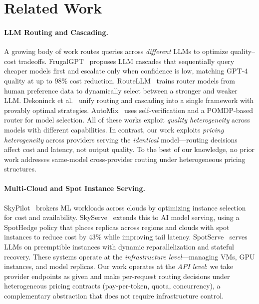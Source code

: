 \section{Related Work}
\label{sec:related}

\paragraph{LLM Routing and Cascading.}
A growing body of work routes queries across \textit{different} LLMs to optimize quality--cost tradeoffs.
FrugalGPT~\cite{chen2023frugalgptuselargelanguage} proposes LLM cascades that sequentially query cheaper models first and escalate only when confidence is low, matching GPT-4 quality at up to 98\% cost reduction.
RouteLLM~\cite{ong2025routellmlearningroutellms} trains router models from human preference data to dynamically select between a stronger and weaker LLM.
Dekoninck et al.~\cite{dekoninck2025unifiedapproachroutingcascading} unify routing and cascading into a single framework with provably optimal strategies.
AutoMix~\cite{aggarwal2025automixautomaticallymixinglanguage} uses self-verification and a POMDP-based router for model selection.
All of these works exploit \textit{quality heterogeneity} across models with different capabilities.
In contrast, our work exploits \textit{pricing heterogeneity} across providers serving the \textit{identical} model---routing decisions affect cost and latency, not output quality.
To the best of our knowledge, no prior work addresses same-model cross-provider routing under heterogeneous pricing structures.

\paragraph{Multi-Cloud and Spot Instance Serving.}
SkyPilot~\cite{DBLP:conf/nsdi/YangWLCBKZLMSS23} brokers ML workloads across clouds by optimizing instance selection for cost and availability.
SkyServe~\cite{DBLP:conf/eurosys/MaoXWCGBYSS25} extends this to AI model serving, using a SpotHedge policy that places replicas across regions and clouds with spot instances to reduce cost by 43\% while improving tail latency.
SpotServe~\cite{miao2023spotserveservinggenerativelarge} serves LLMs on preemptible instances with dynamic reparallelization and stateful recovery.
These systems operate at the \textit{infrastructure level}---managing VMs, GPU instances, and model replicas.
Our work operates at the \textit{API level}: we take provider endpoints as given and make per-request routing decisions under heterogeneous pricing contracts (pay-per-token, quota, concurrency), a complementary abstraction that does not require infrastructure control.

